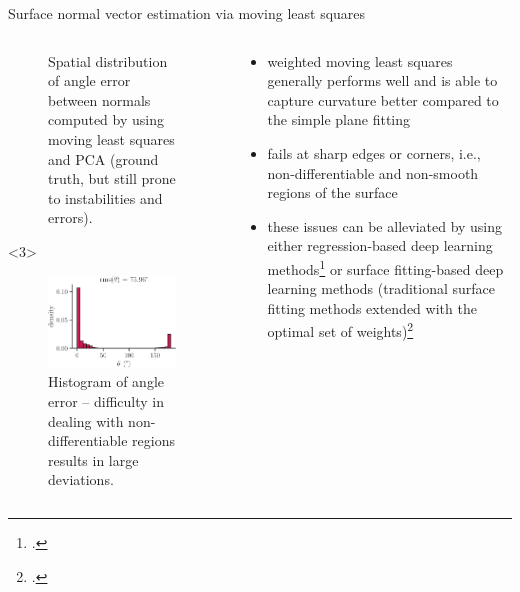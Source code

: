 \documentclass[xcolor=dvipsnames,10pt]{beamer}
\begin{document}
\begin{frame}{Surface normal vector estimation via moving least squares}
\begin{columns}[c]
\begin{column}{0.5\textwidth}
\begin{onlyenv}
\begin{center}
\begin{figure}
                    \caption{Spatial distribution of angle error between normals computed by using moving least squares and PCA (ground truth, but still prone to instabilities and errors).}
                \end{figure}
                \end{center}
            \end{onlyenv}
            \begin{onlyenv}<3>
                \begin{center}
                \begin{figure}
                    \includegraphics[width=0.95\textwidth]{figures/ear_error_hist.pdf}
                    \caption{Histogram of angle error -- difficulty in dealing with non-differentiable regions results in large deviations.}
                \end{figure}
                \end{center}
            \end{onlyenv}
        \end{column} 
        \begin{column}{0.5\textwidth}
            \begin{itemize}
                \item<1> weighted moving least squares generally performs well and is able to capture curvature better compared to the simple plane fitting
                \item<2> fails at sharp edges or corners, i.e., non-differentiable and non-smooth regions of the surface
                \item<3>these issues can be alleviated by using either regression-based deep learning methods\footcite{Charles2017,Guerrero2018,Ben-Shabat2019} or surface fitting-based deep learning methods (traditional surface fitting methods extended with the optimal set of weights)\footcite{Lenssen2020,Ben-Shabat2020,Zhu2021}
            \end{itemize}
        \end{column}
    \end{columns} 
\end{frame}
\end{document}
